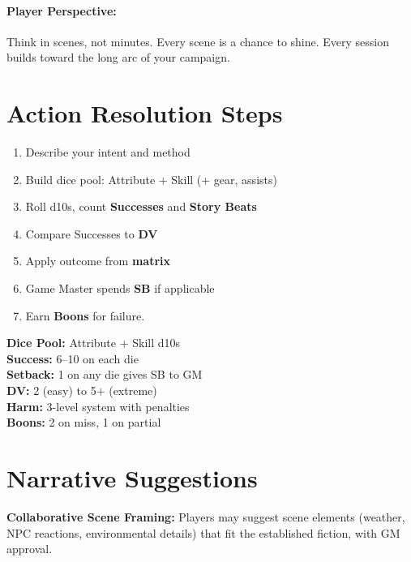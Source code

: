 \paragraph{Player Perspective:}  
Think in scenes, not minutes. Every scene is a chance to shine. Every session builds toward the long arc of your campaign.

\section{Action Resolution Steps}

\begin{enumerate}
  \item Describe your intent and method
  \item Build dice pool: Attribute + Skill (+ gear, assists)
  \item Roll d10s, count \textbf{Successes} and \textbf{Story Beats}
  \item Compare Successes to \textbf{DV}
  \item Apply outcome from \textbf{matrix}
  \item Game Master spends \textbf{SB} if applicable
  \item Earn \textbf{Boons} for failure.
\end{enumerate}

\begin{tcolorbox}[colback=blue!5!white,colframe=blue!75!black,title=Quick Reference,fonttitle=\bfseries]
\textbf{Dice Pool:} Attribute + Skill d10s \\
\textbf{Success:} 6--10 on each die \\
\textbf{Setback:} 1 on any die gives SB to GM \\
\textbf{DV:} 2 (easy) to 5+ (extreme) \\
\textbf{Harm:} 3-level system with penalties \\
\textbf{Boons:} 2 on miss, 1 on partial 
\end{tcolorbox}

\section{Narrative Suggestions}

\textbf{Collaborative Scene Framing:} Players may suggest scene elements (weather, NPC reactions, environmental details) that fit the established fiction, with GM approval.

